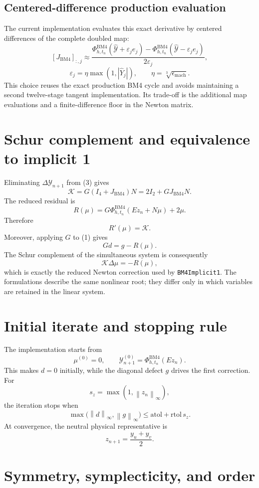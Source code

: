 \documentclass[11pt,a4paper]{article}
\newcommand{\Id}{I}
\newcommand{\Y}{\mathcal{Y}}
\newcommand{\PhiBM}{\Phi^{\mathrm{BM4}}_{h,t_n}}
\newcommand{\norm}[1]{\left\lVert #1\right\rVert}
\begin{document}
\subsection*{Centered-difference production evaluation}

The current implementation evaluates this exact derivative by centered
differences of the complete doubled map:
\[
 [J_{\mathrm{BM4}}]_{:,j}
 \approx
 \frac{\PhiBM(\widehat{\Y}+\varepsilon_je_j)
       -\PhiBM(\widehat{\Y}-\varepsilon_je_j)}{2\varepsilon_j},
\]
\[
 \varepsilon_j
 =\eta\max(1,|\widehat{Y}_j|),
 \qquad
 \eta=\sqrt[3]{\epsilon_{\mathrm{mach}}}.
\]
This choice reuses the exact production BM4 cycle and avoids maintaining a
second twelve-stage tangent implementation.  Its trade-off is the additional
map evaluations and a finite-difference floor in the Newton matrix.

\section{Schur complement and equivalence to implicit 1}

Eliminating $\Delta\Y_{n+1}$ from (3) gives
\[
 \mathcal K
 =G(\Id_4+J_{\mathrm{BM4}})N
 =2\Id_2+GJ_{\mathrm{BM4}}N. \tag{4}
\]
The reduced residual is
\[
 R(\mu)=G\PhiBM(Ez_n+N\mu)+2\mu.
\]
Therefore
\[
 R'(\mu)=\mathcal K.
\]
Moreover, applying $G$ to (1) gives
\[
 Gd=g-R(\mu).
\]
The Schur complement of the simultaneous system is consequently
\[
 \boxed{\mathcal K\Delta\mu=-R(\mu),}
\]
which is exactly the reduced Newton correction used by \texttt{BM4Implicit1}.
The formulations describe the same nonlinear root; they differ only in which
variables are retained in the linear system.

\section{Initial iterate and stopping rule}

The implementation starts from
\[
 \mu^{(0)}=0,
 \qquad
 \Y_{n+1}^{(0)}=\PhiBM(Ez_n).
\]
This makes $d=0$ initially, while the diagonal defect $g$ drives the first
correction.  For
\[
 s_z=\max(1,\norm{z_n}_\infty),
\]
the iteration stops when
\[
 \max\bigl(\norm d_\infty,\norm g_\infty\bigr)
 \leq \mathrm{atol}+\mathrm{rtol}\,s_z.
\]
At convergence, the neutral physical representative is
\[
 z_{n+1}=\frac{y_u+y_v}{2}.
\]

\section{Symmetry, symplecticity, and order}
\end{document}
